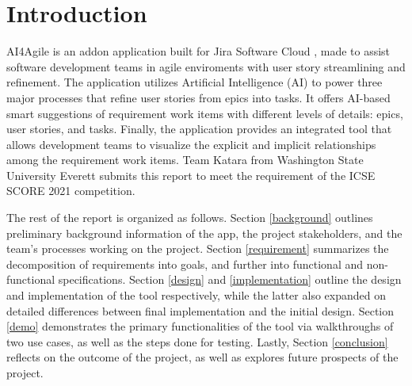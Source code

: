 \section{Introduction}
AI4Agile is an addon application built for Jira Software Cloud \cite{jira2}, made to assist software development teams in agile enviroments with user story streamlining and refinement. The application utilizes Artificial Intelligence (AI) to power three major processes that refine user stories from epics into tasks. It offers AI-based smart suggestions of requirement work items with different levels of details: epics, user stories, and tasks. Finally, the application provides an integrated tool that allows development teams to visualize the explicit and implicit relationships among the requirement work items. Team Katara from Washington State University Everett submits this report to meet the requirement of the ICSE SCORE 2021 competition. 

The rest of the report is organized as follows. Section \ref{background} outlines preliminary background information of the app, the project stakeholders, and the team's processes working on the project. Section \ref{requirement} summarizes the decomposition of requirements into goals, and further into functional and non-functional specifications. Section \ref{design} and \ref{implementation} outline the design and implementation of the tool respectively, while the latter also expanded on detailed differences between final implementation and the initial design. Section \ref{demo} demonstrates the primary functionalities of the tool via walkthroughs of two use cases, as well as the steps done for testing. Lastly, Section 
\ref{conclusion} reflects on the outcome of the project, as well as explores future prospects of the project. 

